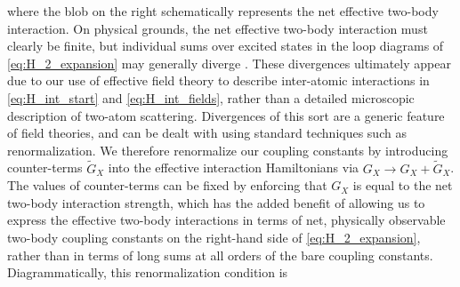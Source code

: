 \documentclass[preprint,showkeys,nofootinbib]{revtex4-1}
\newcommand{\1}{\mathds{1}}
\begin{document}
where the blob on the right schematically represents the net effective
two-body interaction.  On physical grounds, the net effective two-body
interaction must clearly be finite, but individual sums over excited
states in the loop diagrams of \eqref{eq:H_2_expansion} may generally
diverge \cite{johnson2012effective}.  These divergences ultimately
appear due to our use of effective field theory to describe
inter-atomic interactions in \eqref{eq:H_int_start} and
\eqref{eq:H_int_fields}, rather than a detailed microscopic
description of two-atom scattering.  Divergences of this sort are a
generic feature of field theories, and can be dealt with using
standard techniques such as renormalization.  We therefore renormalize
our coupling constants by introducing counter-terms $\tilde G_X$ into
the effective interaction Hamiltonians via $G_X\to G_X+\tilde G_X$.
The values of counter-terms can be fixed by enforcing that $G_X$ is
equal to the net two-body interaction strength, which has the added
benefit of allowing us to express the effective two-body interactions
in terms of net, physically observable two-body coupling constants on
the right-hand side of \eqref{eq:H_2_expansion}, rather than in terms
of long sums at all orders of the bare coupling constants.
Diagrammatically, this renormalization condition is
\end{document}
